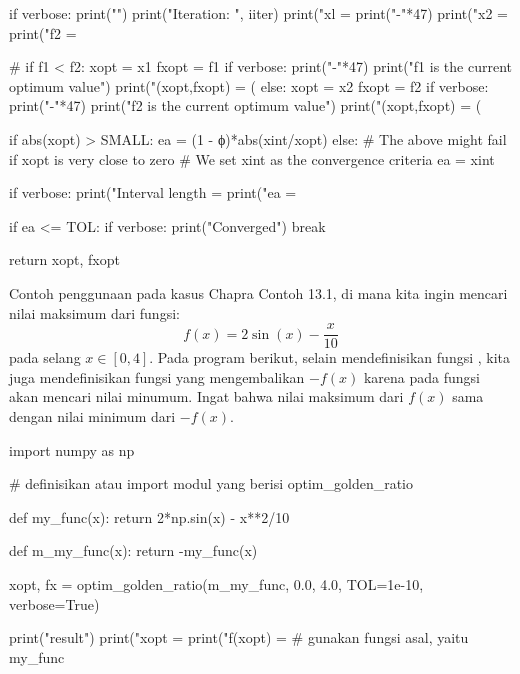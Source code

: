 \begin{pythoncode}
        if verbose:
            print("")
            print("Iteration: ", iiter)
            print("xl = %
            print("-"*47)
            print("x2 = %
            print("f2 = %

        #
        if f1 < f2:
            xopt = x1
            fxopt = f1
            if verbose:
                print("-"*47)
                print("f1 is the current optimum value")
                print("(xopt,fxopt) = (%
        else:
            xopt = x2
            fxopt = f2
            if verbose:
                print("-"*47)
                print("f2 is the current optimum value")
                print("(xopt,fxopt) = (%

        if abs(xopt) > SMALL:
            ea = (1 - ϕ)*abs(xint/xopt)
        else:
            # The above might fail if xopt is very close to zero
            # We set xint as the convergence criteria
            ea = xint

        if verbose:
            print("Interval length = %
            print("ea              = %

        if ea <= TOL:
            if verbose:
                print("Converged")
            break

    return xopt, fxopt
\end{pythoncode}

Contoh penggunaan pada kasus Chapra Contoh 13.1, di mana kita ingin mencari
nilai maksimum dari fungsi:
\begin{equation*}
f(x) = 2\sin(x) - \frac{x}{10}
\end{equation*}
pada selang $x \in [0,4]$.
Pada program berikut, selain mendefinisikan fungsi ,
kita juga mendefinisikan fungsi  yang mengembalikan
$-f(x)$ karena pada fungsi  akan
mencari nilai minumum. Ingat bahwa nilai maksimum dari $f(x)$ sama
dengan nilai minimum dari $-f(x)$.

\begin{pythoncode}
import numpy as np

# definisikan atau import modul yang berisi optim_golden_ratio

def my_func(x):
    return 2*np.sin(x) - x**2/10

def m_my_func(x):
    return -my_func(x)

xopt, fx = optim_golden_ratio(m_my_func, 0.0, 4.0, TOL=1e-10, verbose=True)

print("\nOptimization result")
print("xopt    = %
print("f(xopt) = %
# gunakan fungsi asal, yaitu my_func
\end{pythoncode}



